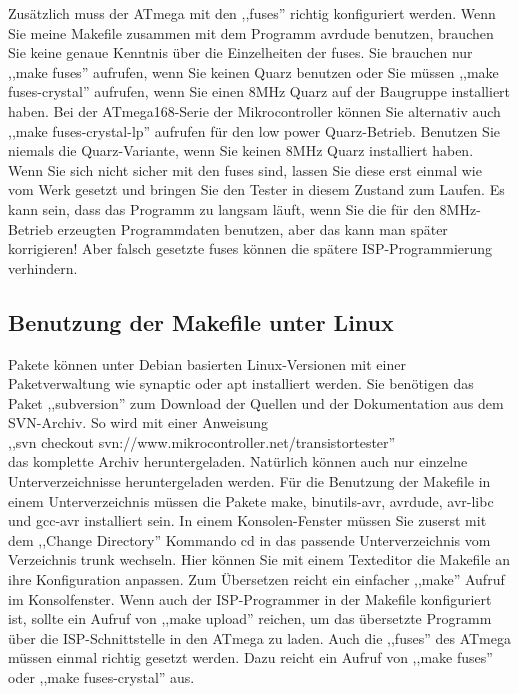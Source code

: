 Zusätzlich muss der ATmega mit den ,,fuses'' richtig konfiguriert werden.
Wenn Sie meine Makefile zusammen mit dem Programm avrdude \cite{avrdude} benutzen, brauchen Sie
keine genaue Kenntnis über die Einzelheiten der fuses.
Sie brauchen nur ,,make fuses'' aufrufen, wenn Sie keinen Quarz benutzen oder Sie
müssen ,,make fuses-crystal'' aufrufen, wenn Sie einen 8MHz Quarz auf der Baugruppe installiert haben.
Bei der ATmega168-Serie der Mikrocontroller können Sie alternativ auch
,,make fuses-crystal-lp'' aufrufen für den low power Quarz-Betrieb.
Benutzen Sie niemals die Quarz-Variante, wenn Sie keinen 8MHz Quarz installiert haben.
Wenn Sie sich nicht sicher mit den fuses sind, lassen Sie diese erst einmal wie
vom Werk gesetzt und bringen Sie den Tester in diesem Zustand zum Laufen.
Es kann sein, dass das Programm zu langsam läuft, wenn Sie die für den 8MHz-Betrieb 
erzeugten Programmdaten benutzen, aber das kann man später korrigieren!
Aber falsch gesetzte fuses können die spätere ISP-Programmierung verhindern.

\subsection{Benutzung der Makefile unter Linux}
Pakete können unter Debian basierten Linux-Versionen mit einer Paketverwaltung wie synaptic oder apt installiert werden.
Sie benötigen das Paket ,,subversion'' zum Download der Quellen und der
Dokumentation aus dem SVN-Archiv.
So wird mit einer Anweisung \\
,,svn checkout svn://www.mikrocontroller.net/transistortester'' \\
das komplette Archiv heruntergeladen. Natürlich können auch nur einzelne Unterverzeichnisse
heruntergeladen werden.
Für die Benutzung der Makefile in einem Unterverzeichnis müssen die Pakete
make, binutils-avr, avrdude, avr-libc und gcc-avr installiert sein.
In einem Konsolen-Fenster müssen Sie zuserst mit dem ,,Change Directory'' Kommando cd in das passende 
Unterverzeichnis vom Verzeichnis trunk wechseln.
Hier können Sie mit einem Texteditor die Makefile an ihre Konfiguration anpassen.
Zum Übersetzen reicht ein einfacher ,,make'' Aufruf im Konsolfenster.
Wenn auch der ISP-Programmer in der Makefile konfiguriert ist, sollte ein Aufruf von ,,make upload''
reichen, um das übersetzte Programm über die ISP-Schnittstelle in den ATmega zu laden.
Auch die ,,fuses'' des ATmega müssen einmal richtig gesetzt werden.
Dazu reicht ein Aufruf von ,,make fuses'' oder ,,make fuses-crystal'' aus.


